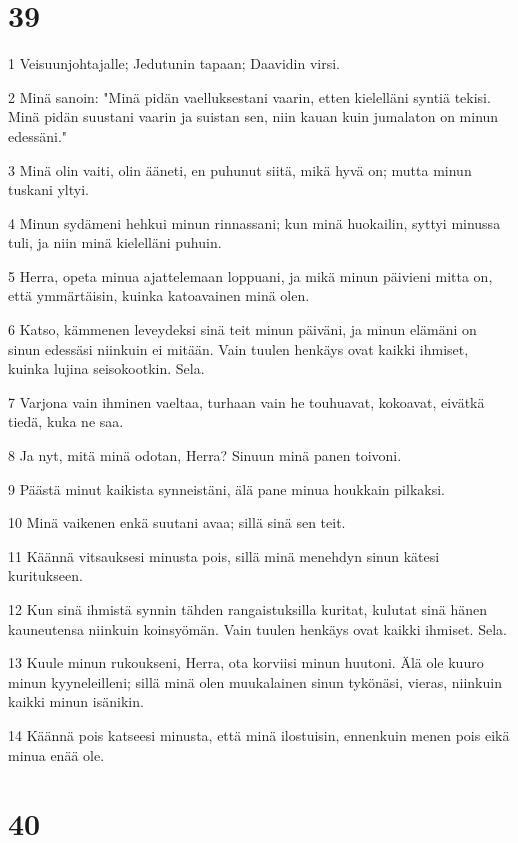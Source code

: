 \chapter{39}

\par 1 Veisuunjohtajalle; Jedutunin tapaan; Daavidin virsi.
\par 2 Minä sanoin: "Minä pidän vaelluksestani vaarin, etten kielelläni syntiä tekisi. Minä pidän suustani vaarin ja suistan sen, niin kauan kuin jumalaton on minun edessäni."
\par 3 Minä olin vaiti, olin ääneti, en puhunut siitä, mikä hyvä on; mutta minun tuskani yltyi.
\par 4 Minun sydämeni hehkui minun rinnassani; kun minä huokailin, syttyi minussa tuli, ja niin minä kielelläni puhuin.
\par 5 Herra, opeta minua ajattelemaan loppuani, ja mikä minun päivieni mitta on, että ymmärtäisin, kuinka katoavainen minä olen.
\par 6 Katso, kämmenen leveydeksi sinä teit minun päiväni, ja minun elämäni on sinun edessäsi niinkuin ei mitään. Vain tuulen henkäys ovat kaikki ihmiset, kuinka lujina seisokootkin. Sela.
\par 7 Varjona vain ihminen vaeltaa, turhaan vain he touhuavat, kokoavat, eivätkä tiedä, kuka ne saa.
\par 8 Ja nyt, mitä minä odotan, Herra? Sinuun minä panen toivoni.
\par 9 Päästä minut kaikista synneistäni, älä pane minua houkkain pilkaksi.
\par 10 Minä vaikenen enkä suutani avaa; sillä sinä sen teit.
\par 11 Käännä vitsauksesi minusta pois, sillä minä menehdyn sinun kätesi kuritukseen.
\par 12 Kun sinä ihmistä synnin tähden rangaistuksilla kuritat, kulutat sinä hänen kauneutensa niinkuin koinsyömän. Vain tuulen henkäys ovat kaikki ihmiset. Sela.
\par 13 Kuule minun rukoukseni, Herra, ota korviisi minun huutoni. Älä ole kuuro minun kyyneleilleni; sillä minä olen muukalainen sinun tykönäsi, vieras, niinkuin kaikki minun isänikin.
\par 14 Käännä pois katseesi minusta, että minä ilostuisin, ennenkuin menen pois eikä minua enää ole.

\chapter{40}

